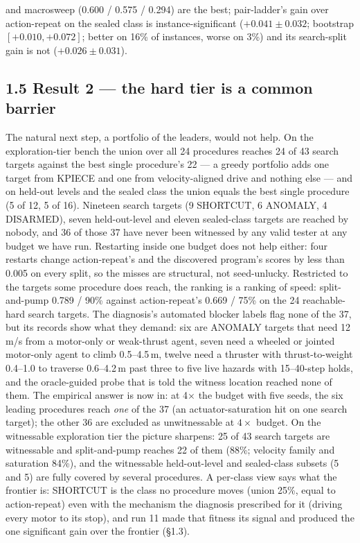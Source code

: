 and macrosweep (0.600 / 0.575 / 0.294) are the best; pair-ladder's gain over action-repeat on the sealed class is instance-significant ($+0.041\pm0.032$; bootstrap $[+0.010, +0.072]$; better on 16\% of instances, worse on 3\%) and its search-split gain is not ($+0.026\pm0.031$).

\subsection*{1.5 Result 2 --- the hard tier is a common barrier}
\label{sec:barrier}
The natural next step, a portfolio of the leaders, would not help. On the exploration-tier bench the union over all 24 procedures reaches
24 of 43 search targets against the best single procedure's 22 --- a greedy portfolio adds one target from KPIECE and one from velocity-aligned
drive and nothing else --- and on held-out levels and the sealed class the union equals the best single procedure (5 of 12, 5 of 16). Nineteen
search targets (9 SHORTCUT, 6 ANOMALY, 4 DISARMED), seven held-out-level and eleven sealed-class targets are reached by nobody, and 36 of those
37 have never been witnessed by any valid tester at any budget we have run. Restarting inside one budget does not help either: four restarts
change action-repeat's and the discovered program's scores by less than 0.005 on every split, so the misses are structural, not seed-unlucky.
Restricted to the targets some procedure does reach, the ranking is a ranking of speed: split-and-pump 0.789 / 90\% against action-repeat's
0.669 / 75\% on the 24 reachable-hard search targets. The diagnosis's automated blocker labels flag none of the 37, but its records show what they demand: six are ANOMALY targets that need 12\,m/s from a motor-only or weak-thrust agent, seven need a wheeled or jointed motor-only agent to climb 0.5--4.5\,m, twelve need a thruster with thrust-to-weight 0.4--1.0 to traverse 0.6--4.2\,m past three to five live hazards with 15--40-step holds, and the oracle-guided probe that is told the witness location reached none of them. The empirical answer is now in: at 4$\times$ the budget with five seeds, the six leading procedures reach \emph{one} of the 37 (an actuator-saturation hit on one search target); the other 36 are excluded as unwitnessable at $4\times$ budget. On the witnessable exploration tier the picture sharpens: 25 of 43 search targets are witnessable and split-and-pump reaches 22 of them (88\%; velocity family and saturation 84\%), and the witnessable held-out-level and sealed-class subsets (5 and 5) are fully covered by several procedures.
A per-class view says what the frontier is: SHORTCUT is the class no procedure moves (union 25\%, equal to action-repeat) even with the
mechanism the diagnosis prescribed for it (driving every motor to its stop), and run 11 made that fitness its signal and produced the one significant gain over the frontier (\S1.3).

